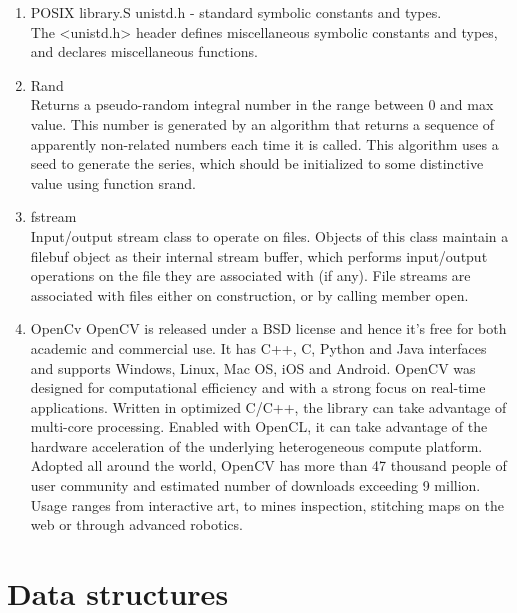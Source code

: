 \documentclass[twocolumn]{IEEEtran}
\begin{document}
\begin{enumerate}
         \item POSIX library.S unistd.h - standard symbolic constants and types.\\
         The <unistd.h> header defines miscellaneous symbolic constants and types, and declares 
         miscellaneous functions.\\
            
         \item Rand \\
         Returns a pseudo-random integral number in the range between 0 and max value. This number is 
         generated by an algorithm that returns a sequence of apparently non-related numbers each time 
         it is called. This algorithm uses a seed to generate the series, which should be initialized 
         to some distinctive value using function srand.\cite{17}\\
            
         \item fstream \\
         Input/output stream class to operate on files. Objects of this class maintain a filebuf object 
         as their internal stream buffer, which performs input/output operations on the file they are 
         associated with (if any). File streams are associated with files either on construction, or by 
         calling member open.\\
         
         \item OpenCv
         OpenCV is released under a BSD license and hence it’s free for both academic and commercial 
         use. It has C++, C, Python and Java interfaces and supports Windows, Linux, Mac OS, iOS and 
         Android. OpenCV was designed for computational efficiency and with a strong focus on real-time 
         applications. Written in optimized C/C++, the library can take advantage of multi-core 
         processing. Enabled with OpenCL, it can take advantage of the hardware acceleration of the 
         underlying heterogeneous compute platform. Adopted all around the world, OpenCV has more than 
         47 thousand people of user community and estimated number of downloads exceeding 9 million. 
         Usage ranges from interactive art, to mines inspection, stitching maps on the web or through 
         advanced robotics.

	\end{enumerate}



\section{Data structures}
\end{document}

